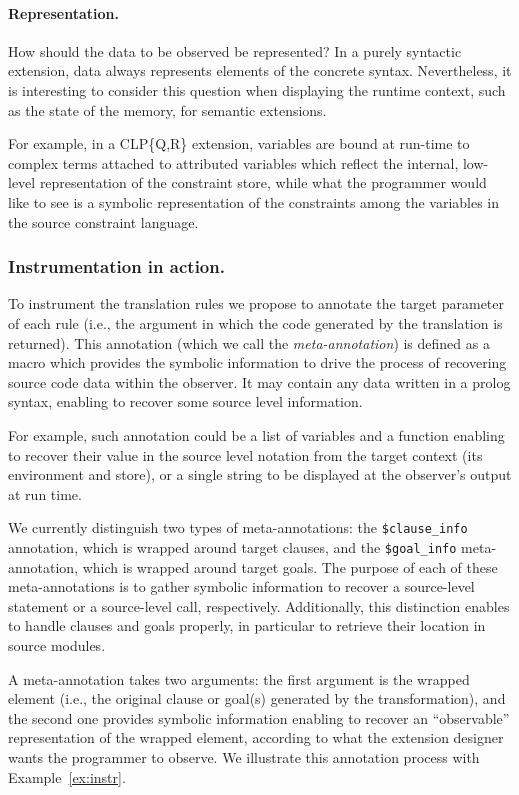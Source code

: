 \documentclass[preprint]{llncs}
\newcommand{\pre}[1]{\texttt{#1}}
\begin{document}
\paragraph{Representation.} How should the data to be observed be
represented?  In a purely syntactic extension, data always represents
elements of the concrete syntax. Nevertheless, it is interesting to
consider this question when displaying the runtime context, such as
the state of the memory, for semantic extensions.

For example, in a CLP\{Q,R\} extension, variables are bound at
run-time to complex terms attached to attributed variables which
reflect the internal, low-level representation of the constraint
store, while what the programmer would like to see is a symbolic
representation of the constraints among the variables in the source
constraint language.

\subsubsection{Instrumentation in action.}

To instrument the translation rules we propose to annotate the target
parameter of each rule (i.e., the argument in which the code generated
by the translation is returned). This annotation (which we call the
\emph{meta-annotation}) is defined as a macro which provides the
symbolic information to drive the process of recovering source code
data within the observer. It may contain any data written in a prolog syntax,
enabling to recover some source level information. 

For example, such annotation could be 
a list of variables and a function enabling to recover their value
in the source level notation from the target context (its environment
and store), or a single string to be displayed at the 
observer's output at run time.

We currently distinguish two types of
meta-annotations: the \pre{\$clause\_info} annotation, which is
wrapped around target clauses, and the \pre{\$goal\_info}
meta-annotation, which is wrapped around target goals. The purpose of
each of these meta-annotations is to gather symbolic information to
recover a source-level statement or a source-level call, respectively.
Additionally, this distinction enables to handle clauses and goals
properly, in particular to retrieve their location in source modules.

A meta-annotation takes two arguments: the first argument is the
wrapped element (i.e., the original clause or goal(s) generated by the
transformation), and the second one provides symbolic information
enabling to recover an ``observable'' representation of the wrapped
element, according to what the extension designer wants the programmer
to observe. 
We illustrate this annotation process with Example~\ref{ex:instr}. 
\end{document}
